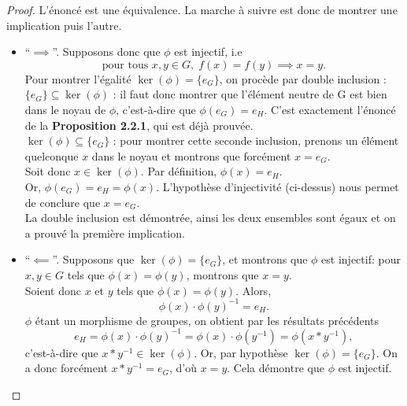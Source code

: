 \documentclass[oneside,12pt,french,table]{book}
\theoremstyle{definition}
\theoremstyle{definition}
\theoremstyle{definition}
\begin{document}
\begin{proof}
L'énoncé est une équivalence. La marche à suivre est donc de montrer une implication puis l'autre. 
\begin{itemize}
    \item ``$\implies$''. Supposons donc que $\phi$ est injectif, i.e $$\text{pour tous } x,y \in G, \; f(x) = f(y) \implies x = y.$$ 
    Pour montrer l'égalité $\ker(\phi) = \{ e_G \}$, on procède par double inclusion : \\
    \underline{$ \{e_G\} \subseteq \ker(\phi)$} : il faut donc montrer que l'élément neutre de G est bien dans le noyau de $\phi$, c'est-à-dire que $\phi(e_G) = e_H$. C'est exactement l'énoncé de la \textbf{Proposition 2.2.1}, qui est déjà prouvée. \\
    \underline{$\ker(\phi) \subseteq  \{e_G\}$} : pour montrer cette seconde inclusion, prenons un élément quelconque $x$ dans le noyau et montrons que forcément $x = e_G$. \\
    Soit donc $x \in \ker(\phi)$. Par définition, $\phi(x) =  e_H$. \\
    Or, $\phi(e_G) = e_H = \phi(x)$. L'hypothèse d'injectivité (ci-dessus) nous permet de conclure que $x = e_G$. \\
    La double inclusion est démontrée, ainsi les deux ensembles sont égaux et on a prouvé la première implication.
    \item ``$\impliedby$''. Supposons que $\ker(\phi) = \{e_G\}$, et montrons que $\phi$ est injectif: pour $x,y \in G$ tels que $\phi(x) = \phi(y)$, montrons que $x = y$. \\
    Soient donc $x$ et $y$ tels que $\phi(x)=\phi(y)$. Alors,
    \[\phi(x) \cdot \phi(y) ^{-1} = e_H.\]
    $\phi$ étant un morphisme de groupes, on obtient par les résultats précédents 
    \[e_H = \phi(x) \cdot \phi(y) ^{-1}  = \phi(x) \cdot \phi(y^{-1}) = \phi(x * y^{-1}),\]
    c'est-à-dire que $x * y^{-1} \in \ker(\phi)$. Or, par hypothèse $\ker(\phi) = \{e_G\}$. On a donc forcément $x * y^{-1} = e_G$, d'où $x = y$. Cela démontre que $\phi$ est injectif.
\end{itemize}
\end{proof}
\end{document}
